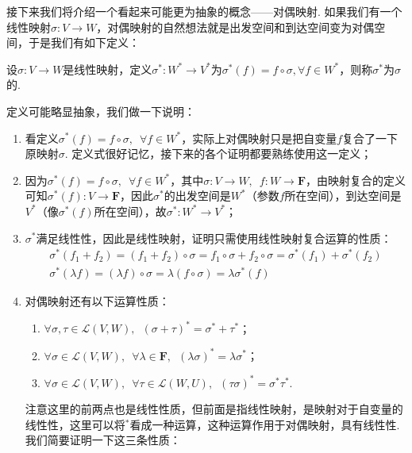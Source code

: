 接下来我们将介绍一个看起来可能更为抽象的概念——对偶映射. 如果我们有一个线性映射$\sigma:V\to W$，对偶映射的自然想法就是出发空间和到达空间变为对偶空间，于是我们有如下定义：
\begin{definition}[对偶映射] 
    设$\sigma:V\to W$是线性映射，定义$\sigma^*:W^*\to V^*$为$\sigma^*(f)=f\circ\sigma,\forall f\in W^*$，则称$\sigma^*$为$\sigma$的.
\end{definition}
定义可能略显抽象，我们做一下说明：
\begin{enumerate}
    \item 看定义$\sigma^*(f)=f\circ\sigma,\enspace\forall f\in W^*$，实际上对偶映射只是把自变量$f$复合了一下原映射$\sigma$. 定义式很好记忆，接下来的各个证明都要熟练使用这一定义；

    \item 因为$\sigma^*(f)=f\circ\sigma,\enspace\forall f\in W^*$，其中$\sigma:V\to W,\enspace f:W\to\mathbf{F}$，由映射复合的定义可知$\sigma^*(f):V\to\mathbf{F}$，因此$\sigma^*$的出发空间是$W^*$（参数$f$所在空间），到达空间是$V^*$（像$\sigma^*(f)$所在空间），故$\sigma^*:W^*\to V^*$；

    \item $\sigma^*$满足线性性，因此是线性映射，证明只需使用线性映射复合运算的性质：
          \begin{gather*}
              \sigma^*(f_1+f_2)=(f_1+f_2)\circ\sigma=f_1\circ\sigma+f_2\circ\sigma=\sigma^*(f_1)+\sigma^*(f_2) \\
              \sigma^*(\lambda f)=(\lambda f)\circ\sigma=\lambda(f\circ\sigma)=\lambda\sigma^*(f)
          \end{gather*}

    \item 对偶映射还有以下运算性质：
          \begin{enumerate}
              \item $\forall\sigma,\tau\in\mathcal{L}(V,W),\enspace (\sigma+\tau)^*=\sigma^*+\tau^*$；

              \item $\forall\sigma\in\mathcal{L}(V,W),\enspace \forall\lambda\in\mathbf{F},\enspace (\lambda\sigma)^*=\lambda\sigma^*$；

              \item $\forall\sigma\in\mathcal{L}(V,W),\enspace \forall\tau\in\mathcal{L}(W,U),\enspace (\tau\sigma)^*=\sigma^*\tau^*$.
          \end{enumerate}
          注意这里的前两点也是线性性质，但前面是指线性映射，是映射对于自变量的线性性，这里可以将$^*$看成一种运算，这种运算作用于对偶映射，具有线性性. 我们简要证明一下这三条性质：


\end{enumerate}
